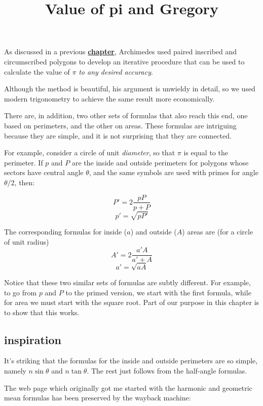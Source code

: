 \documentclass[11pt, oneside]{article}
\title{Value of pi and Gregory}
\date{}
\begin{document}
\maketitle
\Large

\label{sec:Gregory}

As discussed in a previous \hyperref[sec:Value_of_pi]{\textbf{chapter}}, Archimedes used paired inscribed and circumscribed polygons to develop an iterative procedure that can be used to calculate the value of $\pi$ \emph{to any desired accuracy}.  

Although the method is beautiful, his argument is unwieldy in detail, so we used modern trigonometry to achieve the same result more economically.

There are, in addition, two other sets of formulas that also reach this end, one based on perimeters, and the other on areas.  These formulas are intriguing because they are simple, and it is not surprising that they are connected.  

For example, consider a circle of unit \emph{diameter}, so that $\pi$ is equal to the perimeter.  If $p$ and $P$ are the inside and outside perimeters for polygons whose sectors have central angle $\theta$, and the same symbols are used with primes for angle $\theta/2$, then:

\[ P' = 2 \frac{pP}{p + P} \]
\[ p' = \sqrt{pP'} \]

The corresponding formulas for inside ($a$) and outside ($A$) areas are (for a circle of unit radius)
\[ A' = 2 \frac{a'A}{a' + A} \]
\[ a' = \sqrt{aA} \]

Notice that these two similar sets of formulas are subtly different.  For example, to go from $p$ and $P$ to the primed version, we start with the first formula, while for area we must start with the square root.  Part of our purpose in this chapter is to show that this works.

\subsection*{inspiration}

It's striking that the formulas for the inside and outside perimeters are so simple, namely $n \sin \theta$ and $n \tan \theta$.  The rest just follows from the half-angle formulas.

The web page which originally got me started with the harmonic and geometric mean formulas has been preserved by the wayback machine:
\end{document}
